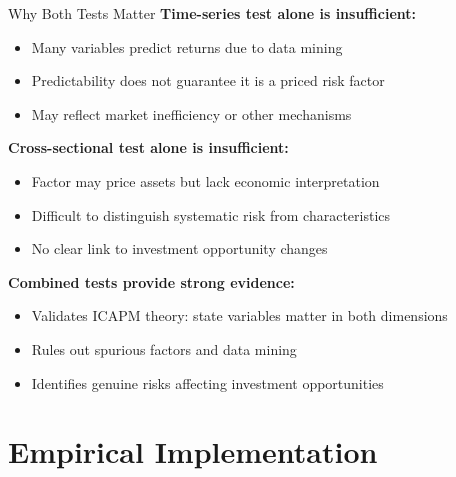 \documentclass{beamer}
\begin{document}
\begin{frame}{Why Both Tests Matter}
\textbf{Time-series test alone is insufficient:}
\begin{itemize}
\item Many variables predict returns due to data mining
\item Predictability does not guarantee it is a priced risk factor
\item May reflect market inefficiency or other mechanisms
\end{itemize}

\vspace{0.3cm}
\textbf{Cross-sectional test alone is insufficient:}
\begin{itemize}
\item Factor may price assets but lack economic interpretation
\item Difficult to distinguish systematic risk from characteristics
\item No clear link to investment opportunity changes
\end{itemize}

\vspace{0.3cm}
\textbf{Combined tests provide strong evidence:}
\begin{itemize}
\item Validates ICAPM theory: state variables matter in both dimensions
\item Rules out spurious factors and data mining
\item Identifies genuine risks affecting investment opportunities
\end{itemize}
\end{frame}

\section{Empirical Implementation}
\end{document}
